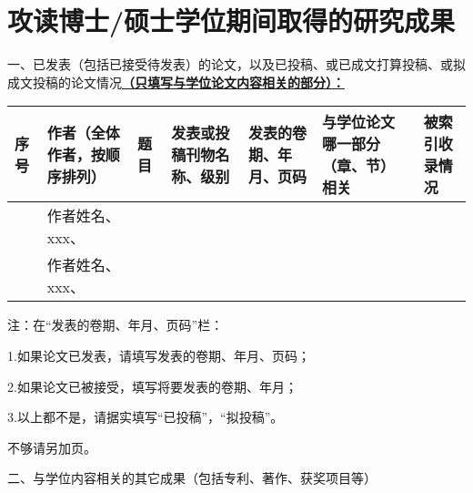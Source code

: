 \chapter{攻读博士/硕士学位期间取得的研究成果} %
\pubfont %
一、已发表（包括已接受待发表）的论文，以及已投稿、或已成文打算投稿、或拟成文投稿的论文情况\underline{\textbf{（只填写与学位论文内容相关的部分）：}}
\begin{table}
	\centering{}%
	\pubfont 
	\begin{longtable}{|>{\centering}m{0.5cm}|m{1.8cm}|>{\centering}m{2.8cm}|>{\centering}m{2.5cm}|>{\centering}m{2.2cm}|>{\centering}m{}|>{\centering}m{1cm}|}
		\hline 
		\textbf{序号} & \textbf{作者（全体作者，按顺序排列）} & \textbf{题 目} 						   & \textbf{发表或投稿刊物名称、级别} & \textbf{发表的卷期、年月、页码} & \textbf{与学位论文哪一部分（章、节）相关} &\textbf{被索引收录情况}\tabularnewline
		\hline 
		1    & 作者姓名、xxx、					  &  &  &  &  & \tabularnewline
		\hline 
		2	 & 	作者姓名、xxx、						&  			 &   &  &  & \tabularnewline
		\hline 
	\end{longtable}
\end{table}

注：在“发表的卷期、年月、页码”栏：

1.如果论文已发表，请填写发表的卷期、年月、页码；

2.如果论文已被接受，填写将要发表的卷期、年月；

3.以上都不是，请据实填写“已投稿”，“拟投稿”。

不够请另加页。

二、与学位内容相关的其它成果（包括专利、著作、获奖项目等）







        

